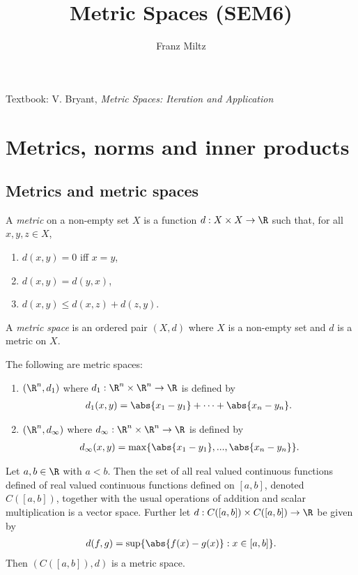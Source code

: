 \documentclass{article}
\begin{document}
\mkthmstwounified
\title{Metric Spaces (SEM6)}
\author{Franz Miltz}
\maketitle
\noindent Textbook: V. Bryant, \emph{Metric Spaces: Iteration and Application}
\tableofcontents
\pagebreak

\section{Metrics, norms and inner products}

\subsection{Metrics and metric spaces}

\begin{definition}
    A \emph{metric} on a non-empty set $X$ is a function $d:X\times X\to\R$
    such that, for all $x,y,z\in X$,
    \begin{enumerate}
        \item $d(x,y)=0$ iff $x=y$,
        \item $d(x,y)=d(y,x)$,
        \item $d(x,y)\leq d(x,z) + d(z,y)$.
    \end{enumerate}
    A \emph{metric space} is an ordered pair $(X,d)$ where $X$ is a non-empty set and
    $d$ is a metric on $X$.
\end{definition}

\begin{lemma}
    The following are metric spaces:
    \begin{enumerate}
        \item $(\R^n, d_1)$ where $d_1:\R^n\times\R^n\to\R$ is defined by \begin{align*}
                  d_1(x,y)=\abs{x_1-y_1}+\cdots+\abs{x_n-y_n}.
              \end{align*}
        \item $(\R^n, d_\infty)$ where $d_\infty:\R^n\times\R^n\to\R$ is defined by \begin{align*} d_\infty(x,y)=\max\{\abs{x_1-y_1},...,\abs{x_n-y_n}\}.
              \end{align*}
    \end{enumerate}
\end{lemma}

\begin{lemma}
    Let $a,b\in\R$ with $a<b$.
    Then the set of all real valued continuous functions defined of real valued
    continuous functions defined on $[a,b]$, denoted $C([a,b])$, together with
    the usual operations of addition and scalar multiplication is a vector space.
    Further let $d:C([a,b])\times C([a,b])\to \R$ be given by
    \begin{align*}
        d(f,g)=\sup\{\abs{f(x)-g(x)}:x\in[a,b]\}.
    \end{align*}
    Then $(C([a,b]),d)$ is a metric space.
\end{lemma}
\end{document}
